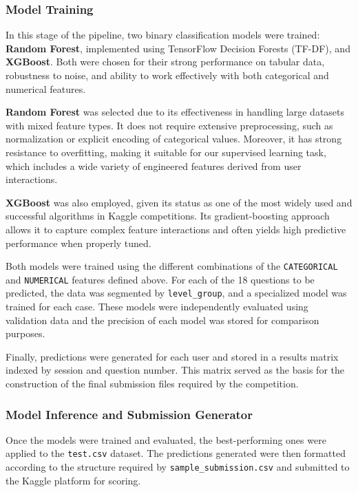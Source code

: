 \documentclass[12pt]{article}
\begin{document}
	
	\subsubsection{Model Training}
	
	In this stage of the pipeline, two binary classification models were trained: \textbf{Random Forest}, implemented using TensorFlow Decision Forests (TF-DF), and \textbf{XGBoost}. Both were chosen for their strong performance on tabular data, robustness to noise, and ability to work effectively with both categorical and numerical features.
	
	\textbf{Random Forest} was selected due to its effectiveness in handling large datasets with mixed feature types. It does not require extensive preprocessing, such as normalization or explicit encoding of categorical values. Moreover, it has strong resistance to overfitting, making it suitable for our supervised learning task, which includes a wide variety of engineered features derived from user interactions.
	
	\textbf{XGBoost} was also employed, given its status as one of the most widely used and successful algorithms in Kaggle competitions. Its gradient-boosting approach allows it to capture complex feature interactions and often yields high predictive performance when properly tuned.
	
	Both models were trained using the different combinations of the \texttt{CATEGORICAL} and \texttt{NUMERICAL} features defined above. For each of the 18 questions to be predicted, the data was segmented by \texttt{level\_group}, and a specialized model was trained for each case. These models were independently evaluated using validation data and the precision of each model was stored for comparison purposes.
	
	Finally, predictions were generated for each user and stored in a results matrix indexed by session and question number. This matrix served as the basis for the construction of the final submission files required by the competition.
	
	
	\subsubsection{Model Inference and Submission Generator}
	
	Once the models were trained and evaluated, the best-performing ones were applied to the \texttt{test.csv} dataset. The predictions generated were then formatted according to the structure required by \texttt{sample\_submission.csv} and submitted to the Kaggle platform for scoring.
	
\end{document}

